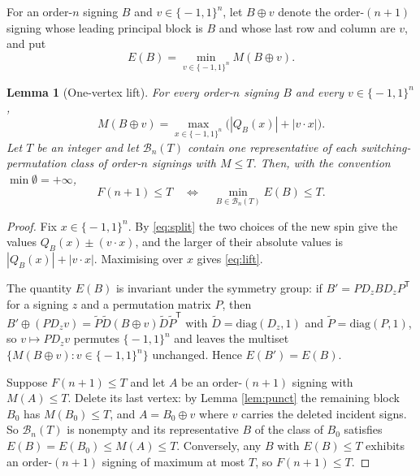 \documentclass[11pt]{article}
\newcommand{\eps}{\{\!-1,1\!\}}
\newcommand{\T}{\mathsf T}
\newtheorem{lemma}[theorem]{Lemma}
\theoremstyle{remark}
\begin{document}
For an order-$n$ signing $B$ and $v\in\eps^n$, let $B\oplus v$ denote the
order-$(n+1)$ signing whose leading principal block is $B$ and whose last row
and column are $v$, and put
\begin{equation}
 E(B)=\min_{v\in\eps^n}M(B\oplus v).                          \label{eq:Edef}
\end{equation}

\begin{lemma}[One-vertex lift]\label{lem:lift}
For every order-$n$ signing $B$ and every $v\in\eps^n$,
\begin{equation}
 M(B\oplus v)=\max_{x\in\eps^n}\bigl(|Q_B(x)|+|v\cdot x|\bigr).
                                                              \label{eq:lift}
\end{equation}
Let $T$ be an integer and let $\mathcal B_n(T)$ contain one representative of
each switching-permutation class of order-$n$ signings with $M\le T$.  Then,
with the convention $\min\emptyset=+\infty$,
\begin{equation}
 F(n+1)\le T
 \quad\Longleftrightarrow\quad
 \min_{B\in\mathcal B_n(T)}E(B)\le T .                        \label{eq:crit}
\end{equation}
\end{lemma}

\begin{proof}
Fix $x\in\eps^n$.  By \eqref{eq:split} the two choices of the new spin give
the values $Q_B(x)\pm(v\cdot x)$, and the larger of their absolute values is
$|Q_B(x)|+|v\cdot x|$.  Maximising over $x$ gives \eqref{eq:lift}.

The quantity $E(B)$ is invariant under the symmetry group: if
$B'=PD_zBD_zP^{\T}$ for a signing $z$ and a permutation matrix $P$, then
$B'\oplus(PD_zv)=\widetilde P\widetilde D(B\oplus v)\widetilde D\widetilde P^{\T}$
with $\widetilde D=\mathrm{diag}(D_z,1)$ and $\widetilde P=\mathrm{diag}(P,1)$,
so $v\mapsto PD_zv$ permutes $\eps^n$ and leaves the multiset
$\{M(B\oplus v):v\in\eps^n\}$ unchanged.  Hence $E(B')=E(B)$.

Suppose $F(n+1)\le T$ and let $A$ be an order-$(n+1)$ signing with $M(A)\le T$.
Delete its last vertex: by Lemma \ref{lem:punct} the remaining block $B_0$ has
$M(B_0)\le T$, and $A=B_0\oplus v$ where $v$ carries the deleted incident
signs.  So $\mathcal B_n(T)$ is nonempty and its representative $B$ of the
class of $B_0$ satisfies $E(B)=E(B_0)\le M(A)\le T$.  Conversely, any $B$ with
$E(B)\le T$ exhibits an order-$(n+1)$ signing of maximum at most $T$, so
$F(n+1)\le T$.
\end{proof}
\end{document}
